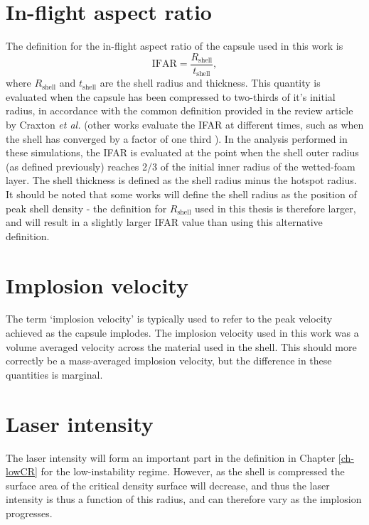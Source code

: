 \section{In-flight aspect ratio}

The definition for the in-flight aspect ratio of the capsule used in this work is \begin{equation} \mathrm{IFAR} = \frac{R_\mathrm{shell}}{t_\mathrm{shell}}, \end{equation}
where $R_\mathrm{shell}$ and $t_\mathrm{shell}$ are the shell radius and thickness. This quantity is evaluated when the capsule has been compressed to two-thirds of it's initial radius, in accordance with the common definition provided in the review article by Craxton \textit{et al.} \cite{Craxton2015} (other works evaluate the IFAR at different times, such as when the shell has converged by a factor of one third \cite{Radha2011}). In the analysis performed in these simulations, the IFAR is evaluated at the point when the shell outer radius (as defined previously) reaches 2/3 of the initial inner radius of the wetted-foam layer. The shell thickness is defined as the shell radius minus the hotspot radius. It should be noted that some works will define the shell radius as the position of peak shell density - the definition for $R_\mathrm{shell}$ used in this thesis is therefore larger, and will result in a slightly larger IFAR value than using this alternative definition.

\section{Implosion velocity}

The term `implosion velocity' is typically used to refer to the peak velocity achieved as the capsule implodes. The implosion velocity used in this work was a volume averaged velocity across the material used in the shell. This should more correctly be a mass-averaged implosion velocity, but the difference in these quantities is marginal. 

\section{Laser intensity}

The laser intensity will form an important part in the definition in Chapter \ref{ch-lowCR} for the low-instability regime. However, as the shell is compressed the surface area of the critical density surface will decrease, and thus the laser intensity is thus a function of this radius, and can therefore vary as the implosion progresses.

